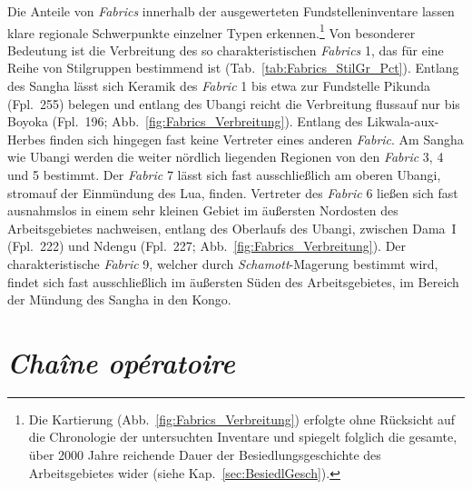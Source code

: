 \begin{multicols}{2}
Die Anteile von \textit{Fabrics} innerhalb der ausgewerteten Fundstelleninventare lassen klare regionale Schwerpunkte einzelner Typen erkennen.\footnote{Die Kartierung (Abb.~\ref{fig:Fabrics_Verbreitung}) erfolgte ohne Rücksicht auf die Chronologie der untersuchten Inventare und spiegelt folglich die gesamte, über 2000 Jahre reichende Dauer der Besiedlungsgeschichte des Arbeitsgebietes wider (siehe Kap.~\ref{sec:BesiedlGesch}).} Von besonderer Bedeutung ist die Verbreitung des so charakteristischen \textit{Fabrics} 1, das für eine Reihe von Stilgruppen bestimmend ist (Tab.~\ref{tab:Fabrics_StilGr_Pct}). Entlang des \mbox{Sangha} lässt sich Keramik des \textit{Fabric} 1 bis etwa zur Fundstelle Pikunda (Fpl.~255) belegen und entlang des \mbox{Ubangi} reicht die Verbreitung flussauf nur bis Boyoka (Fpl.~196; Abb.~\ref{fig:Fabrics_Verbreitung}). Entlang des \mbox{Likwala}-\mbox{aux}-\mbox{Herbes} finden sich hingegen fast keine Vertreter eines anderen \textit{Fabric}. Am \mbox{Sangha} wie \mbox{Ubangi} werden die weiter nördlich liegenden Regionen von den \textit{Fabric} 3, 4 und 5 bestimmt. Der \textit{Fabric} 7 lässt sich fast ausschließlich am oberen \mbox{Ubangi}, stromauf der Einmündung des Lua, finden. Vertreter des \textit{Fabric} 6 ließen sich fast ausnahmslos in einem sehr kleinen Gebiet im äußersten Nordosten des Arbeitsgebietes nachweisen, entlang des Oberlaufs des \mbox{Ubangi}, zwischen Dama~I (Fpl.~222) und Ndengu (Fpl.~227; Abb.~\ref{fig:Fabrics_Verbreitung}). Der charakteristische \textit{Fabric} 9, welcher durch \textit{Schamott}-Magerung bestimmt wird, findet sich fast ausschließlich im äußersten Süden des Arbeitsgebietes, im Bereich der Mündung des \mbox{Sangha} in den Kongo.%

\section{\textit{Chaîne opératoire}}\label{sec:Herstellung_ChaineOperatoire}


\end{multicols}
